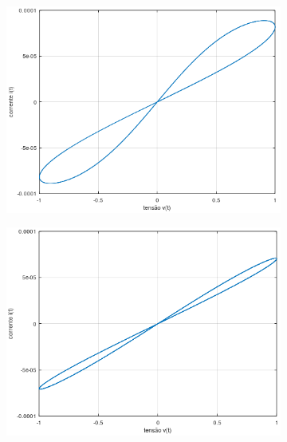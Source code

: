 \documentclass{ceel}
\begin{document}
\begin{multicols}{2}
\begin{figure}[ht]
\begin{subfigure}{0.33\textwidth}
\centering
\includegraphics[width=\columnwidth]{w0}
\caption{} \label{spice:pinched}
\end{subfigure}
\hfill
\begin{subfigure}{0.33\textwidth}
\centering
\includegraphics[width=\columnwidth]{2w0}
\caption{} \label{spice:vt-it}
\end{subfigure}
\hfill
\begin{subfigure}{0.33\textwidth}
\centering

\end{subfigure}
\end{figure}
\end{multicols}
\end{document}
